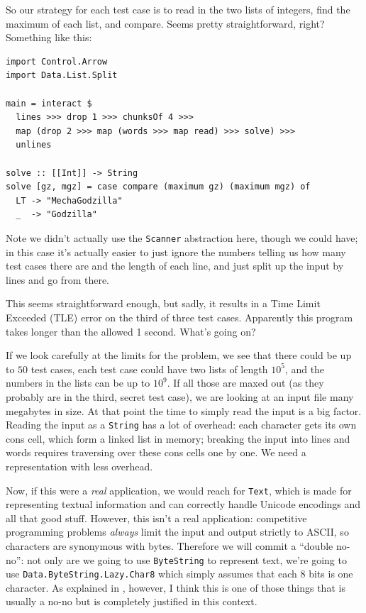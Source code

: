 \documentclass{book}
\newcommand{\pref}[1]{\prettyref{#1}}
\newcommand{\h}[1]{\texttt{#1}}
\begin{document}
So our strategy for each test case is to read in the two lists of
integers, find the maximum of each list, and compare.  Seems pretty
straightforward, right?  Something like this:

\begin{verbatim}
import Control.Arrow
import Data.List.Split

main = interact $
  lines >>> drop 1 >>> chunksOf 4 >>>
  map (drop 2 >>> map (words >>> map read) >>> solve) >>>
  unlines

solve :: [[Int]] -> String
solve [gz, mgz] = case compare (maximum gz) (maximum mgz) of
  LT -> "MechaGodzilla"
  _  -> "Godzilla"
\end{verbatim}

Note we didn't actually use the \h{Scanner} abstraction here, though
we could have; in this case it's actually easier to just ignore the
numbers telling us how many test cases there are and the length of
each line, and just split up the input by lines and go from there.

This seems straightforward enough, but sadly, it results in a Time
Limit Exceeded (TLE) error on the third of three test cases.
Apparently this program takes longer than the allowed 1 second.
What's going on?

If we look carefully at the limits for the problem, we see that there
could be up to $50$ test cases, each test case could have two lists of
length $10^5$, and the numbers in the lists can be up to $10^9$.  If
all those are maxed out (as they probably are in the third, secret
test case), we are looking at an input file many megabytes in size.
At that point the time to simply read the input is a big factor.
Reading the input as a \h{String} has a lot of overhead: each
character gets its own cons cell, which form a linked list in memory;
breaking the input into lines and words requires traversing over these
cons cells one by one.  We need a representation with less overhead.

Now, if this were a \emph{real} application, we would reach for
\h{Text}, which is made for representing textual information and can
correctly handle Unicode encodings and all that good stuff.  However,
this isn't a real application: competitive programming problems
\emph{always} limit the input and output strictly to ASCII, so
characters are synonymous with bytes.  Therefore we will commit a
``double no-no'': not only are we going to use \h{ByteString} to
represent text, we're going to use \h{Data.ByteString.Lazy.Char8}
which simply assumes that each 8 bits is one character. As explained
in \pref{chap:XYZ}, however, I think this is one of those things that
is usually a no-no but is completely justified in this context.
\end{document}
